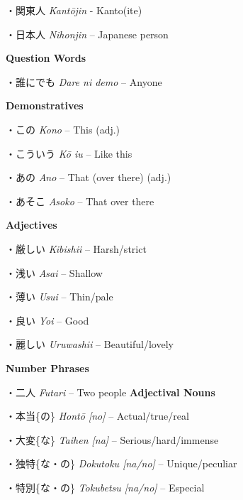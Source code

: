 \par{・関東人 \emph{Kantōjin }- Kanto(ite) }

\par{・日本人 \emph{Nihonjin }– Japanese person }

\par{\textbf{Question Words }}

\par{・誰にでも \emph{Dare ni demo }– Anyone }

\par{\textbf{Demonstratives }}

\par{・この \emph{Kono }– This (adj.) }

\par{・こういう \emph{Kō iu }– Like this }

\par{・あの \emph{Ano }– That (over there) (adj.) }

\par{・あそこ \emph{Asoko }– That over there }

\par{\textbf{Adjectives }}

\par{・厳しい \emph{Kibishii }– Harsh\slash strict }

\par{・浅い \emph{Asai }– Shallow }

\par{・薄い \emph{Usui }– Thin\slash pale }

\par{・良い \emph{Yoi }– Good }

\par{・麗しい \emph{Uruwashii }– Beautiful\slash lovely }

\par{\textbf{Number Phrases }}

\par{・二人 \emph{Futari }– Two people }
  \textbf{Adjectival Nouns }
\par{・本当\{の\} \emph{Hontō [no] }– Actual\slash true\slash real }

\par{・大変\{な\} \emph{Taihen [na] }– Serious\slash hard\slash immense }

\par{・独特\{な・の\} \emph{Dokutoku [na\slash no] }– Unique\slash peculiar }

\par{・特別\{な・の\} \emph{Tokubetsu [na\slash no] }– Especial }

